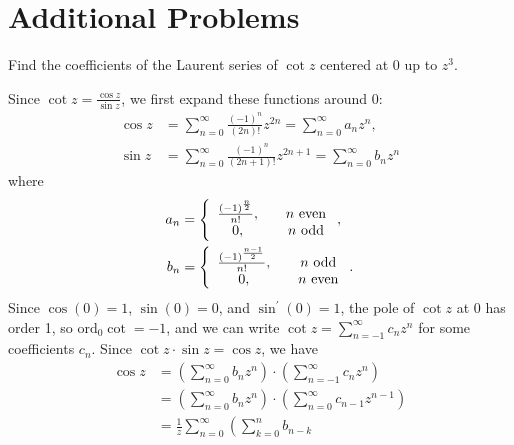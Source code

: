 \documentclass{article}
\newcommand\ord{\mathrm{ord}}
\newcounter{Problem}
\newenvironment{Problem}{\begin{Exercise}[name={Problem},
                                          counter={Problem}]}
                        {\end{Exercise}}
\begin{document}
\section{Additional Problems}

\begin{Problem}
  Find the coefficients of the Laurent series of
  $\cot z$ centered at $0$ up to $z^3$.
\end{Problem}

\begin{Answer}
Since $\cot z = \frac{\cos z}{\sin z}$, we first expand
these functions around 0:
\begin{align*}
   \cos z
&= \sum_{n=0}^\infty
     \frac{(-1)^{n}}
          {(2n)!}
     z^{2n}
 = \sum_{n=0}^\infty
     a_n z^n, \\
   \sin z
&= \sum_{n=0}^\infty
     \frac{(-1)^{n}}
          {(2n + 1)!}
     z^{2n + 1}
 = \sum_{n=0}^\infty
     b_n z^n
\end{align*}
where
\begin{align*}
   a_n
&= \left\{
     \begin{array}{c c}
       \frac{(-1)^{\frac{n}{2}}}{n!}, & \quad n \text{ even} \\
       0,                          & \quad n \text{ odd}
     \end{array}
   \right., \\
   b_n
&= \left\{
     \begin{array}{c c}
       \frac{(-1)^\frac{n-1}{2}}{n!}, & \quad n \text{ odd} \\
       0,                            & \quad n \text{ even}
     \end{array}
   \right.. \\
\end{align*}
Since $\cos(0) = 1$, $\sin(0) = 0$, and
$\sin^\prime(0) = 1$,
the pole of $\cot z$ at 0 has order 1, so
$\ord_0 \cot = -1$, and we can write
$\cot z = \sum_{n=-1}^\infty c_n z^n$ for some
coefficients $c_n$. Since
$\cot z \cdot \sin z = \cos z$, we have
\begin{align*}
   \cos z
&= \left(
     \sum_{n=0}^\infty
       b_n
       z^n
   \right)
   \cdot
   \left(
     \sum_{n=-1}^\infty
       c_n
       z^n
   \right) \\
&= \left(
     \sum_{n=0}^\infty
       b_n
       z^n
   \right)
   \cdot
   \left(
     \sum_{n=0}^\infty
       c_{n-1}
       z^{n-1}
   \right) \\
&= \frac{1}{z}
   \sum_{n=0}^\infty
     \left(
       \sum_{k=0}^n
         b_{n-k}

\end{align*}
\end{Answer}
\end{document}
